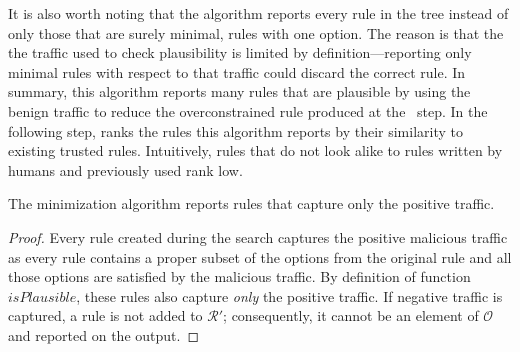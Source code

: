 \documentclass[sigconf,review, anonymous]{acmart}
\begin{document}
It is also worth noting that the algorithm reports every rule in the
tree instead of only those that are surely minimal, \ie{} rules with
one option. The reason is that the the traffic used to check
plausibility is limited by definition---reporting only minimal rules
with respect to that traffic could discard the correct rule. In
summary, this algorithm reports many rules that are plausible by using
the benign traffic to reduce the overconstrained rule produced at the
\reveng\ step. In the following step, \tname{} ranks the rules this
algorithm reports by their similarity to existing trusted
rules. Intuitively, rules that do not look alike to rules written by
humans and previously used rank low.

\begin{proposition}
  \vspace{-1ex}  
  The minimization algorithm reports rules that capture only the
  positive traffic.
\end{proposition}
\begin{proof}
  \vspace{-1.5ex}
  Every rule created during the search captures the positive malicious
  traffic as every rule contains a proper subset of the options from
  the original rule and all those options are satisfied by the
  malicious traffic. By definition of function $\mathit{isPlausible}$,
  these rules also capture \emph{only} the positive traffic. If
  negative traffic is captured, a rule is not added to $\mathcal R'$;
  consequently, it cannot be an element of $\mathcal O$ and reported
  on the output.
  \vspace{-1ex}    
\end{proof}



\end{document}
